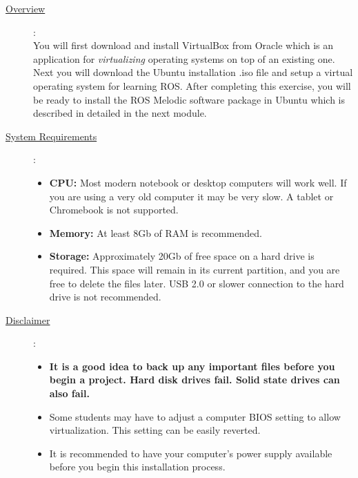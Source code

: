 \documentclass[12pt]{article}
\begin{document}
\begin{description}
	\item[\underline{Overview}]: \vspace{0mm} \\

		        You will first download and install VirtualBox from Oracle which is an application for {\it virtualizing} operating systems on top of an existing one. Next you will download the Ubuntu installation .iso file and setup a virtual operating system for learning ROS.  After completing this exercise, you will be ready to install the ROS Melodic software package in Ubuntu which is described in detailed in the next module. 

	\item[\underline{System Requirements}]: \vspace{0mm} \\

		        \begin{itemize}

					\item {\bf CPU:} Most modern notebook or desktop computers will work well. If you are using a very old computer it may be very slow. A tablet or Chromebook is not supported.
					\item {\bf Memory:} At least 8Gb of RAM is recommended.        
                    \item {\bf Storage:} Approximately 20Gb of free space on a hard drive is required. This space will remain in its current partition, and you are free to delete the files later. USB 2.0 or slower connection to the hard drive is not recommended. 
    
                \end{itemize}
                
			\item[\underline{Disclaimer}]: 
			\begin{itemize}
			
				\item {\bf \R It is a good idea to back up any important files before you begin a project. Hard disk drives fail. Solid state drives can also fail. } 
				\item Some students may have to adjust a computer BIOS setting to allow virtualization. This setting can be easily reverted.   
				\item It is recommended to have your computer's power supply available before you begin this installation process. 
			
			\end{itemize} 			
			

\end{description}
\end{document}
